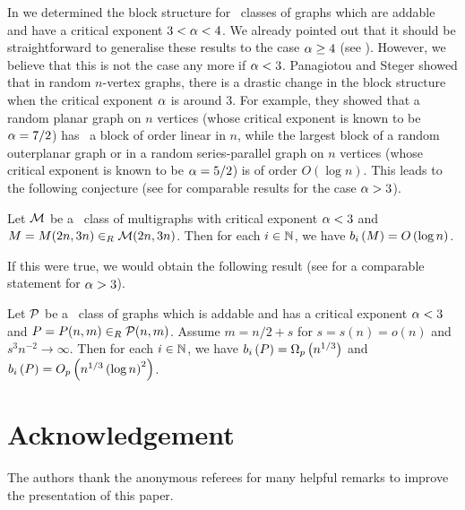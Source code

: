 In  we determined the block structure for \pl\ classes of graphs which are addable and have a critical exponent $3<\alpha<4$. We already pointed out that it should be straightforward to generalise these results to the case $\alpha\geq 4$ (see ). However, we believe that this is not the case any more if $\alpha<3$. Panagiotou and Steger \cite{PanagiotouSteger2010} showed that in random $n$-vertex graphs, there is a drastic change in the block structure when the critical exponent $\alpha$ is around 3. For example, they showed that a random planar graph on $n$ vertices (whose critical exponent is known to be $\alpha=7/2$) has \whp\ a block of order linear in $n$, while the largest block of a random outerplanar graph or in a random series-parallel graph on $n$ vertices (whose critical exponent is known to be $\alpha=5/2$) is of order $O\left(\log n\right)$. This leads to the following conjecture (see  for comparable results for the case $\alpha>3$).

\begin{conjecture}
	Let $\mathcal{M}$ be a \bridgeStable\ class of multigraphs with critical exponent $\alpha<3$ and $M=M(2n,3n)\in_R \mathcal{M}(2n,3n)$. Then for each $i \in \mathbb{N}$, we have $b_{i}\left(M\right)=O\left(\log n\right)$. 
\end{conjecture}

If this were true, we would obtain the following result (see  for a comparable statement for $\alpha>3$).

\begin{conjecture}
	Let $\mathcal{P}$ be a \pl\ class of graphs which is addable and has a critical exponent $\alpha<3$ and $P=P(n,m)\in_R \mathcal{P}(n,m)$. Assume $m=n/2+s$ for $s=s(n)=o\left(n\right)$ and $s^3n^{-2} \to \infty$. Then for each $i\in \mathbb{N}$, we have
		$b_{i}\left(P\right)=\Omega_p\left(n^{1/3}\right)$ and $b_{i}\left(P\right)=O_p\left(n^{1/3}\left(\log n\right)^2\right)$.
\end{conjecture}

\section*{Acknowledgement}
The authors thank the anonymous referees for many helpful remarks to
improve the presentation of this paper.
